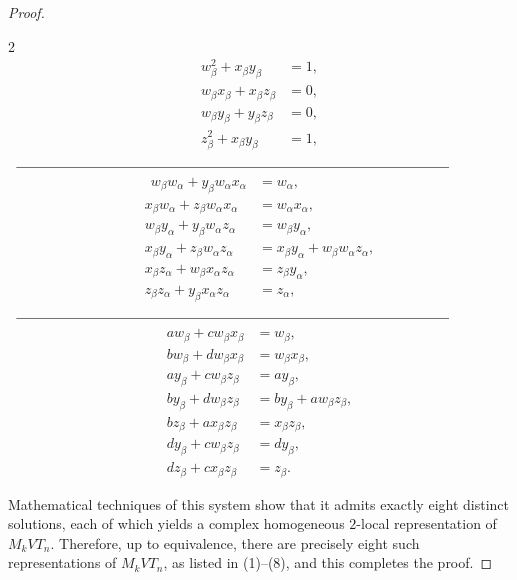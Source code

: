 \documentclass[preprint]{elsarticle}
\begin{document}
\begin{proof}
\begin{tcolorbox}
\begin{multicols}{2}
{
\begin{align*}
w_{\beta}^2 + x_{\beta} y_{\beta} &= 1,\\
w_{\beta} x_{\beta} + x_{\beta} z_{\beta} &= 0,\\
w_{\beta} y_{\beta} + y_{\beta} z_{\beta} &= 0,\\
z_{\beta}^2 + x_{\beta} y_{\beta} &= 1,
\end{align*}
\vspace{-0.2cm}}
$\begin{array}{c}
\rule{.9\linewidth}{0.4pt}
\end{array}$
{
\begin{align*}
~~w_{\beta} w_{\alpha} + y_{\beta} w_{\alpha} x_{\alpha} &= w_{\alpha},\\
x_{\beta} w_{\alpha} + z_{\beta} w_{\alpha} x_{\alpha} &= w_{\alpha} x_{\alpha},\\
w_{\beta} y_{\alpha} + y_{\beta} w_{\alpha} z_{\alpha} &= w_{\beta} y_{\alpha},\\
x_{\beta} y_{\alpha} + z_{\beta} w_{\alpha} z_{\alpha} &= x_{\beta} y_{\alpha} + w_{\beta} w_{\alpha} z_{\alpha},\\
x_{\beta} z_{\alpha} + w_{\beta} x_{\alpha} z_{\alpha} &= z_{\beta} y_{\alpha},\\
z_{\beta} z_{\alpha} + y_{\beta} x_{\alpha} z_{\alpha} &= z_{\alpha},
\end{align*}
\vspace{-0.2cm}}
$\begin{array}{c}
\rule{.9\linewidth}{0.4pt}
\end{array}$
{
\begin{align*}
a w_{\beta} + c w_{\beta} x_{\beta} &= w_{\beta},\\
b w_{\beta} + d w_{\beta} x_{\beta} &= w_{\beta} x_{\beta},\\
a y_{\beta} + c w_{\beta} z_{\beta} &= a y_{\beta},\\
b y_{\beta} + d w_{\beta} z_{\beta} &= b y_{\beta} + a w_{\beta} z_{\beta},\\
b z_{\beta} + a x_{\beta} z_{\beta} &= x_{\beta} z_{\beta},\\
d y_{\beta} + c w_{\beta} z_{\beta} &= d y_{\beta},\\
d z_{\beta} + c x_{\beta} z_{\beta} &= z_{\beta}.
\end{align*}
\vspace{-0.2cm}}
\end{multicols}
\end{tcolorbox}
\noindent Mathematical techniques of this system show that it admits exactly eight distinct solutions, each of which yields a complex homogeneous \(2\)-local representation of \(M_kVT_n\). Therefore, up to equivalence, there are precisely eight such representations of \(M_kVT_n\), as listed in (1)–(8), and this completes the proof.\end{proof}
\end{document}
